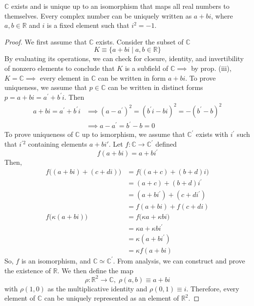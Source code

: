 \documentclass{article}
\begin{document}
    \begin{theorem}
      $\mathbb{C}$ exists and is unique up to an isomorphism that maps all real numbers to themselves. Every complex number can be uniquely written as $a + bi$, where $a, b \in \mathbb{R}$ and $i$ is a fixed element such that $i^2 = -1$. 
    \end{theorem}
    \begin{proof}
      We first assume that $\mathbb{C}$ exists. Consider the subset of $\mathbb{C}$
      \begin{equation}
        K \equiv \{ a + bi \; | \; a, b \in \mathbb{R}\}
      \end{equation}
      By evaluating its operations, we can check for closure, identity, and invertibility of nonzero elements to conclude that $K$ is a subfield of $\mathbb{C} \implies$ by prop. (iii), $K = \mathbb{C} \implies$ every element in $\mathbb{C}$ can be written in form $a + bi$. To prove uniqueness, we assume that $p \in \mathbb{C}$ can be written in distinct forms $p = a + bi = a^{\prime} + b^\prime i$. Then
      \begin{align*}
         a + bi = a^{\prime} + b^\prime i & \implies (a - a^\prime)^2 = (b^\prime i - b i)^2 = - (b^\prime - b)^2 \\
         & \implies a - a^\prime = b^\prime - b = 0
      \end{align*}
      To prove uniqueness of $\mathbb{C}$ up to ismorphism, we assume that $\mathbb{C}^\prime$ exists with $i^\prime$ such that $i^{\prime 2}$ containing elements $a + b i'$. Let $f: \mathbb{C} \longrightarrow \mathbb{C}^\prime$ defined 
      \begin{equation}
        f( a + bi) = a + bi^\prime
      \end{equation}
      Then, 
      \begin{align*}
        f\big((a + b i) + (c + d i) \big) & = f\big( (a + c) + (b + d)i \big) \\
        & = (a + c) + (b + d) i^\prime \\
        & = (a + b i^\prime) + (c + d i^\prime) \\
        & = f(a + b i) + f( c + d i) \\
        f\big( \kappa (a + b i)\big) & = f\big( \kappa a + \kappa b i\big) \\
        & = \kappa a + \kappa b i^\prime \\
        & = \kappa (a + b i^\prime) \\
        & = \kappa f(a + b i)
      \end{align*}
      So, $f$ is an isomorphism, and $\mathbb{C} \simeq \mathbb{C}^\prime$. From analysis, we can construct and prove the existence of $\mathbb{R}$. We then define the map
      \begin{equation}
        \rho: \mathbb{R}^2 \longrightarrow \mathbb{C}, \; \rho(a, b) \equiv a + bi
      \end{equation}
      with $\rho(1, 0)$ as the multiplicative identity and $\rho(0,1) \equiv i$. Therefore, every element of $\mathbb{C}$ can be uniquely represented as an element of $\mathbb{R}^2$. 
    \end{proof}
\end{document}
